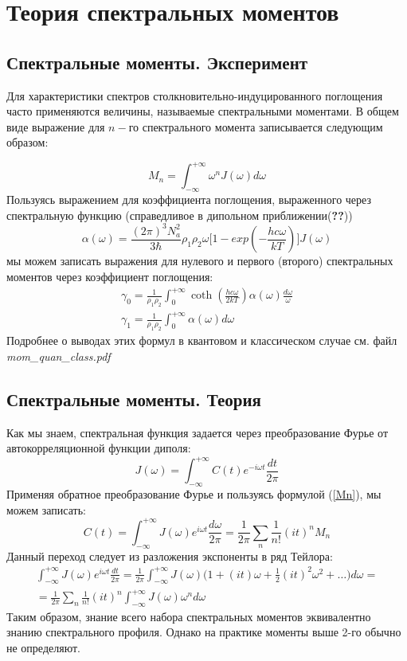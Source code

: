 
\section{Теория спектральных моментов}
\subsection{Спектральные моменты. Эксперимент}
Для характеристики спектров столкновительно-индуцированного поглощения часто применяются величины, называемые спектральными моментами. В общем виде выражение для $n-$го спектрального момента записывается следующим образом:

\begin{equation}
\label{Mn}
M_n=\int_{-\infty}^{+\infty}\omega^nJ(\omega)d\omega
\end{equation}
Пользуясь выражением для коэффициента поглощения, выраженного через спектральную функцию (справедливое в дипольном приближении(\textbf{??}))
\[
\alpha(\omega)=\frac{(2\pi)^3N_a^2}{3\hbar}\rho_1\rho_2\omega\Big[1-exp(-\frac{hc\omega}{kT}) \Big]J(\omega)
\]
мы можем записать выражения для нулевого и первого (второго) спектральных моментов через коэффициент поглощения:
\begin{equation}
\label{eq:mom_exp}
\begin{aligned}
\gamma_0 = \frac{1}{\rho_1\rho_2}\int_0^{+\infty}\coth(\frac{hc\omega}{2kT})\alpha(\omega)\frac{d\omega}{\omega} \\
\gamma_1 = \frac{1}{\rho_1\rho_2}\int_0^{+\infty}\alpha(\omega)d\omega
\end{aligned}
\end{equation}
Подробнее о выводах этих формул в квантовом и классическом случае см. файл \textit{mom\_quan\_class.pdf}



\subsection{Спектральные моменты. Теория}
Как мы знаем, спектральная функция задается через преобразование Фурье от автокорреляционной функции диполя:
\[
J(\omega)=\int_{-\infty}^{+\infty}C(t)e^{-i\omega t}\frac{dt}{2\pi}
\]
Применяя обратное преобразование Фурье и пользуясь формулой (\ref{Mn}), мы можем записать:
\begin{equation}
\label{autocorr_expansion}
C(t)=\int_{-\infty}^{+\infty}J(\omega)e^{i\omega t}\frac{d\omega}{2\pi} = \frac{1}{2\pi}\sum_n\frac{1}{n!}(it)^n M_n
\end{equation}
Данный переход следует из разложения экспоненты в ряд Тейлора:
\[
\begin{aligned}
\int_{-\infty}^{+\infty}J(\omega)e^{i\omega t}\frac{dt}{2\pi} = \frac{1}{2\pi}\int_{-\infty}^{+\infty}J(\omega)\bigg(1+(it)\omega+\frac{1}{2}(it)^2\omega^2+\ldots \bigg)d\omega  =\\
= \frac{1}{2\pi}\sum_n\frac{1}{n!}(it)^n\int_{-\infty}^{+\infty}J(\omega)\omega^n d\omega
\end{aligned}
\]
Таким образом, знание всего набора спектральных моментов эквивалентно знанию спектрального профиля. Однако на практике моменты выше 2-го обычно не определяют.\\

